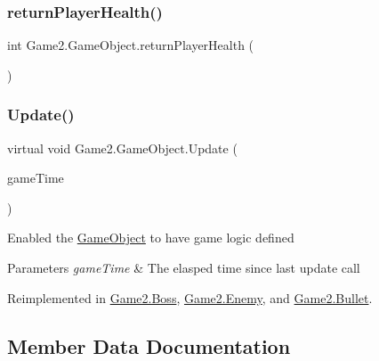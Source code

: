 \subsubsection{\texorpdfstring{return\+Player\+Health()}{returnPlayerHealth()}}
{\footnotesize\ttfamily int Game2.\+Game\+Object.\+return\+Player\+Health (\begin{DoxyParamCaption}{ }\end{DoxyParamCaption})}

\mbox{\label{class_game2_1_1_game_object_a360a294d8a55dcc747c44f8cc1aefe28}} 
\subsubsection{\texorpdfstring{Update()}{Update()}}
{\footnotesize\ttfamily virtual void Game2.\+Game\+Object.\+Update (\begin{DoxyParamCaption}\item[{Game\+Time}]{game\+Time }\end{DoxyParamCaption})\hspace{0.3cm}{\ttfamily [virtual]}}



Enabled the \mbox{\hyperlink{class_game2_1_1_game_object}{Game\+Object}} to have game logic defined 


\begin{DoxyParams}{Parameters}
{\em game\+Time} & The elasped time since last update call\\
\hline
\end{DoxyParams}


Reimplemented in \mbox{\hyperlink{class_game2_1_1_boss_ab120124b7af0edebcb1664e2feaa6590}{Game2.\+Boss}}, \mbox{\hyperlink{class_game2_1_1_enemy_a5e3fdb40fb9884bda064eb671896d264}{Game2.\+Enemy}}, and \mbox{\hyperlink{class_game2_1_1_bullet_a2cf7c4b1a587f2b7e92611d5f6173d3e}{Game2.\+Bullet}}.



\subsection{Member Data Documentation}
\mbox{\label{class_game2_1_1_game_object_ae8a9e4574e531d2fbb2168a155f2ac53}} 
